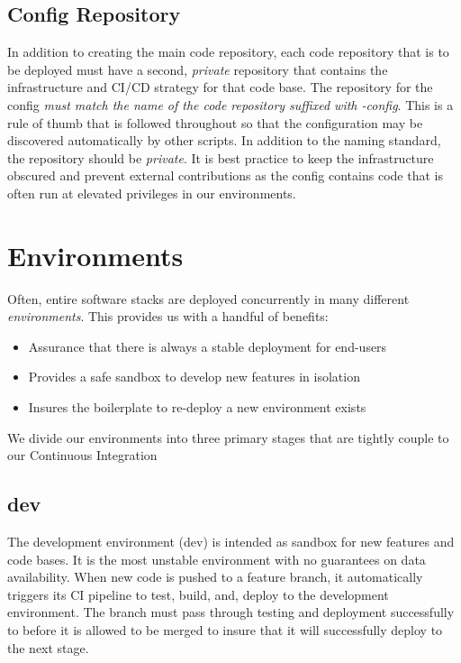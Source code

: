 \documentclass[a4paper,12pt,titlepage]{scrartcl}
\begin{document}
	\subsection{Config Repository}
	
	In addition to creating the main code repository, each code repository that is to be deployed must have a second, {\em private} repository that contains the infrastructure and CI/CD strategy for that code base.
	The repository for the config {\em must match the name of the code repository suffixed with -config}.
	This is a rule of thumb that is followed throughout so that the configuration may be discovered automatically by other scripts.
	In addition to the naming standard, the repository should be {\em private}.
	It is best practice to keep the infrastructure obscured and prevent external contributions as the config contains code that is often run at elevated privileges in our environments.
	
	\section{Environments}
	
	Often, entire software stacks are deployed concurrently in many different {\em environments}. This provides us with a handful of benefits:
	
	\begin{itemize}  
	\item Assurance that there is always a stable deployment for end-users
	\item Provides a safe sandbox to develop new features in isolation
	\item Insures the boilerplate to re-deploy a new environment exists
	\end{itemize}
	
	We divide our environments into three primary stages that are tightly couple to our Continuous Integration
	
	\subsection{dev}
	
	The development environment (dev) is intended as sandbox for  new features and code bases.
	It is the most unstable environment with no guarantees on data availability.
	When new code is pushed to a feature branch, it automatically triggers its CI pipeline to test, build, and, deploy to the development environment.
	The branch must pass through testing and deployment successfully to before it is allowed to be merged to insure that it will successfully deploy to the next stage.
	
\end{document}
